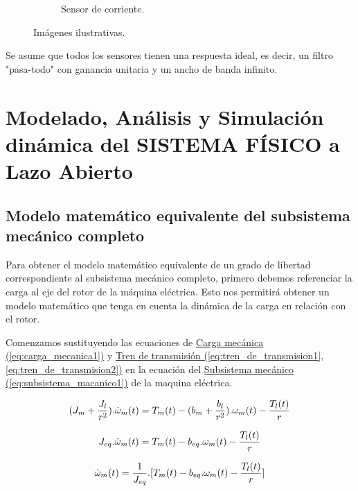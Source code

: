 \documentclass{article}
\begin{document}
\begin{figure}[ht]
\begin{subfigure}[b]{0.3\textwidth}
      \caption{Sensor de corriente.}
    \end{subfigure}
    \caption{Imágenes ilustrativas.}
  \end{figure}


Se asume que todos los sensores tienen una respuesta ideal, es decir, un filtro "pasa-todo" con ganancia 
unitaria y un ancho de banda infinito.


\section{Modelado, Análisis y Simulación dinámica del SISTEMA FÍSICO a Lazo Abierto}


\subsection{Modelo matemático equivalente del subsistema mecánico completo}

Para obtener el modelo matemático equivalente de un grado de libertad correspondiente al subsistema 
mecánico completo, primero debemos referenciar la carga al eje del rotor de la máquina eléctrica. Esto 
nos permitirá obtener un modelo matemático que tenga en cuenta la dinámica de la carga en relación con 
el rotor.

Comenzamos sustituyendo las ecuaciones de
\hyperref[eq:carga_mecanica1]{Carga mecánica (\ref*{eq:carga_mecanica1})} y 
\hyperref[eq:tren_de_transmision1, eq:tren_de_transmision2]{Tren de transmisión (\ref*{eq:tren_de_transmision1}, \ref*{eq:tren_de_transmision2})} 
en la ecuación del
\hyperref[eq:subsistema_macanico1]{Subsistema mecánico (\ref*{eq:subsistema_macanico1})} de la maquina eléctrica.

\begin{equation}
    \label{eq:4.1}
    (J_{m}+\frac{J_l}{r^2}).\dot{\omega}_{m}(t) = T_{m}(t)-(b_{m}+\frac{b_{l}}{r^2}).\omega_{m}(t)-\frac{T_{l}(t)}{r} \\
\end{equation}

\begin{equation}
    J_{eq}.\dot{\omega}_{m}(t) = T_{m}(t)-b_{eq}.\omega_{m}(t)-\frac{T_{l}(t)}{r} \\
\end{equation}

\begin{equation}\label{eq:4.2}
    \dot{\omega}_{m}(t) = \frac{1}{J_{eq}}.[T_{m}(t) - b_{eq}.\omega_{m}(t) - \frac{T_{l}(t)}{r}]\\
\end{equation}
\end{document}

